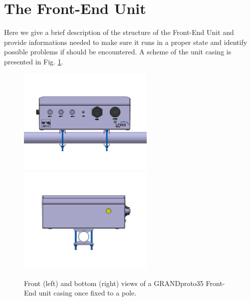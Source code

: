 \section{The Front-End Unit} 
Here we give a brief description of the structure of the Front-End Unit and provide informations needed to make sure it runs in a proper state and identify possible problems if should be encountered. A scheme of the unit casing is presented in Fig. \ref{fig:casing}.

\begin{figure}[t!]
\begin{center}
{
\includegraphics[width=6.5cm,angle=90]{plots/casing.jpg}  
\includegraphics[width=6.5cm,angle=90]{plots/casing_bottom.jpg} 
}
\end{center}
\caption{Front (left) and bottom (right) views of a GRANDproto35 Front-End unit casing once fixed to a pole. 
}
\label{fig:casing} 
\end{figure}


